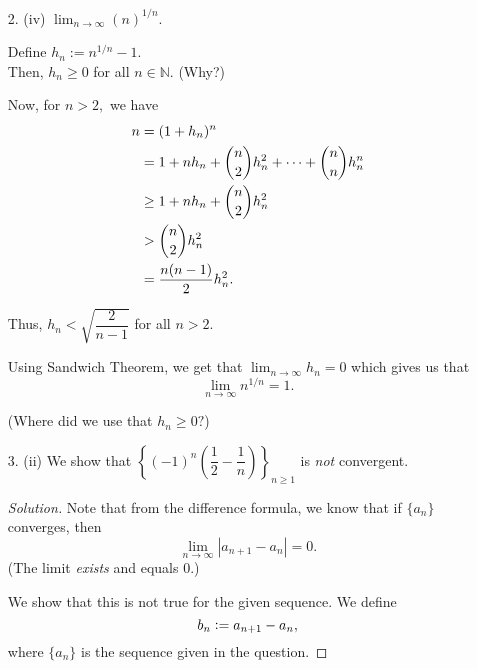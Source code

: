 \documentclass[12pt]{article}
\theoremstyle{definition}
\newenvironment{soln}{\begin{proof}[Solution]}{\end{proof}}
\begin{document}
\begin{itemize}[leftmargin=*]
	\item [2. (iv)]$\displaystyle\lim_{n\to \infty}(n)^{1/n}.$

	Define $h_n := n^{1/n} - 1.$\\
	Then, $h_n \ge 0$ for all $n \in \mathbb{N}.$ \hfill (Why?)

	Now, for $n > 2,$ we have 
	\begin{align*} 
		n &= (1 + h_n)^n \\
		&= 1 + nh_n + \dbinom{n}{2}h_n^2 + \cdots + \dbinom{n}{n}h_n^n\\
		&\ge 1 + nh_n + \dbinom{n}{2}h_n^2 \\
		&> \dbinom{n}{2}h_n^2 \\
		&= \dfrac{n(n-1)}{2}h_n^2.
	\end{align*}

	Thus, $h_n < \sqrt{\dfrac{2}{n-1}}$ for all $n > 2.$

	Using Sandwich Theorem, we get that $\displaystyle\lim_{n\to \infty}h_n = 0$ which gives us that 
	\begin{equation*} 
		\displaystyle\lim_{n\to \infty}n^{1/n} = 1.
	\end{equation*}

	(Where did we use that $h_n \ge 0?$)
	\newpage
	\item[3. (ii)] We show that $\left\{(-1)^n\left(\dfrac{1}{2} - \dfrac{1}{n}\right)\right\}_{n \ge 1}$ is \emph{not} convergent.

	\begin{soln}
	
	Note that from the difference formula, we know that if $\{a_n\}$ converges, then
	\begin{equation*} 
		\lim_{n\to \infty}\left|a_{n+1} - a_n\right| = 0.
	\end{equation*}
	(The limit \emph{exists} and equals $0.$)

	We show that this is not true for the given sequence. We define 
	\begin{equation*} 
		b_{n} \vcentcolon= a_{n + 1} - a_n,
	\end{equation*}
	where $\{a_n\}$ is the sequence given in the question.	


\end{soln}
\end{itemize}
\end{document}

